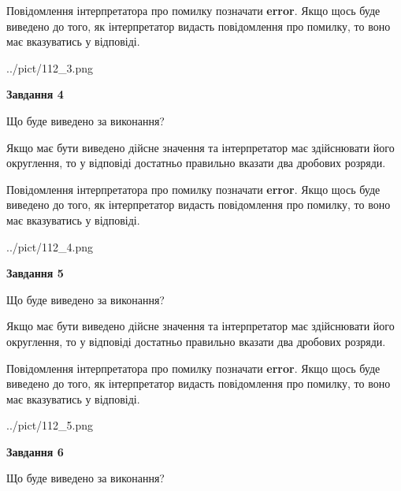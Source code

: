 \documentclass[12pt, ukrainian]{article}
\begin{document}
{\begin {Large}
Повідомлення інтерпретатора про помилку позначати \textbf{error}.
Якщо щось буде виведено до того, як інтерпретатор видасть повідомлення про помилку, 
то воно має вказуватись у відповіді. \par

\begin{center}
	{../pict/112_3.png}
\end{center}
\newpage

{\begin {center}\textbf{Завдання 4}\end {center}}\par
Що буде виведено за виконання? \par

Якщо має бути виведено дійсне значення та інтерпретатор має здійснювати його округлення, 
то у відповіді достатньо правильно вказати два дробових розряди.

Повідомлення інтерпретатора про помилку позначати \textbf{error}.
Якщо щось буде виведено до того, як інтерпретатор видасть повідомлення про помилку, 
то воно має вказуватись у відповіді. \par

\begin{center}
	{../pict/112_4.png}
\end{center}
\newpage

{\begin {center}\textbf{Завдання 5}\end {center}}\par
Що буде виведено за виконання? \par

Якщо має бути виведено дійсне значення та інтерпретатор має здійснювати його округлення, 
то у відповіді достатньо правильно вказати два дробових розряди.

Повідомлення інтерпретатора про помилку позначати \textbf{error}.
Якщо щось буде виведено до того, як інтерпретатор видасть повідомлення про помилку, 
то воно має вказуватись у відповіді. \par

\begin{center}
	{../pict/112_5.png}
\end{center}
\newpage

{\begin {center}\textbf{Завдання 6}\end {center}}\par
Що буде виведено за виконання? \par


\end{Large}}
\end{document}

